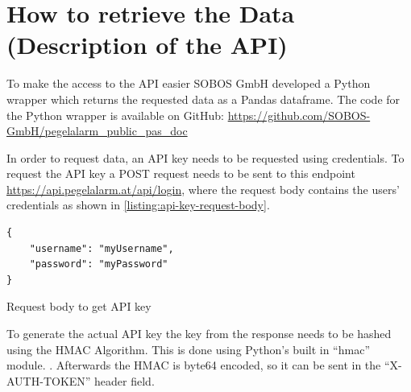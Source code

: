 

\section{How to retrieve the Data (Description of the API)}
To make the access to the API easier SOBOS GmbH developed a Python wrapper which returns the requested data as a Pandas dataframe. The code for the Python wrapper is available on GitHub\cite{GitHub}: \url{https://github.com/SOBOS-GmbH/pegelalarm_public_pas_doc} \cite{strassmayrPegelalarmAPIWrapper2022}

In order to request data, an API key needs to be requested using credentials. To request the API key a POST request needs to be sent to this endpoint \url{https://api.pegelalarm.at/api/login}, where the request body contains the users' credentials as shown in \autoref{listing:api-key-request-body}. 
\begin{listing}
\begin{verbatim}
{
    "username": "myUsername",
    "password": "myPassword"
}
\end{verbatim}
\caption{Request body to get API key}
\label{listing:api-key-request-body}
\end{listing}
To generate the actual API key the key from the response needs to be hashed using the \ac{HMAC} Algorithm. This is done using Python's built in ``hmac'' module. \cite{HmacKeyedHashingMessage}. Afterwards the HMAC is byte64 encoded, so it can be sent in the ``X-AUTH-TOKEN'' header field.

